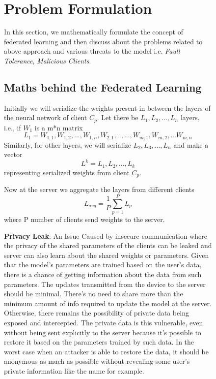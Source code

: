 \documentclass[conference]{IEEEtran}
\begin{document}
\vspace{\baselineskip}

 \setlength{\itemsep}{-2ex}  
 \setlength{\parskip}{0ex} 
 \setlength{\parsep}{0ex}

\begin{figure}

\section{Problem Formulation}
In this section, we mathematically formulate the concept of federated learning and then discuss about the problems related to above approach and various threats to the model i.e. {\itshape Fault Tolerance}, {\itshape Malicious Clients}.

\subsection{Maths behind the Federated Learning}\label{AA}

Initially we will serialize the weights present in between the layers of the neural network of client $C_p$. Let there be $L_1,L_2,...,L_n$ layers, i.e., if $W_1$ is a m*n matrix
\begin{equation}
L_1 = {W_{1,1},W_{1,2},...,W_{1,n},W_{2,1},..,...,W_{m,1},W_{m,2},...W_{m,n}} 
\end{equation}
Similarly, for other layers, we will serialize $L_2,L_3,...,L_n$ 
and make a vector 
\begin{equation}
    L^{k} = {L_1,L_2,...,L_k}
\end{equation}
representing serialized weights from client $C_p$.

Now at the server we aggregate the layers from different clients
\begin{equation}
    L_{avg} = \frac{1}{P} \sum_{p=1}^{P} L_{p}
\end{equation}
    where P number of clients send weights to the server.

\vspace{\baselineskip}

\textbf{Privacy Leak}: An Issue Caused by insecure communication where the privacy of the shared parameters of the clients can be leaked and server can also learn about the shared weights or parameters. Given that the model’s parameters are trained based on the user’s data, there is a chance of getting information about the data from such parameters. The updates transmitted from the device to the server should be minimal. There’s no need to share more than the minimum amount of info required to update the model at the server. Otherwise, there remains the possibility of private data being exposed and intercepted. The private data is this vulnerable, even without being sent explicitly to the server because it’s possible to restore it based on the parameters trained by such data. In the worst case when an attacker is able to restore the data, it should be anonymous as much as possible without revealing some user’s private information like the name for example.


\end{figure}
\end{document}
